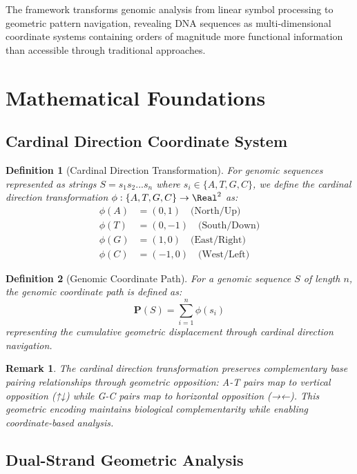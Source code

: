\documentclass[12pt,a4paper]{article}
\newtheorem{definition}{Definition}
\newtheorem{remark}{Remark}
\begin{document}
The framework transforms genomic analysis from linear symbol processing to geometric pattern navigation, revealing DNA sequences as multi-dimensional coordinate systems containing orders of magnitude more functional information than accessible through traditional approaches.

\section{Mathematical Foundations}

\subsection{Cardinal Direction Coordinate System}

\begin{definition}[Cardinal Direction Transformation]
For genomic sequences represented as strings $S = s_1s_2...s_n$ where $s_i \in \{A, T, G, C\}$, we define the cardinal direction transformation $\phi: \{A, T, G, C\} \to \Real^2$ as:
\begin{align}
\phi(A) &= (0, 1) \quad \text{(North/Up)} \\
\phi(T) &= (0, -1) \quad \text{(South/Down)} \\
\phi(G) &= (1, 0) \quad \text{(East/Right)} \\
\phi(C) &= (-1, 0) \quad \text{(West/Left)}
\end{align}
\end{definition}

\begin{definition}[Genomic Coordinate Path]
For a genomic sequence $S$ of length $n$, the genomic coordinate path is defined as:
\begin{equation}
\mathbf{P}(S) = \sum_{i=1}^n \phi(s_i)
\end{equation}
representing the cumulative geometric displacement through cardinal direction navigation.
\end{definition}

\begin{remark}
The cardinal direction transformation preserves complementary base pairing relationships through geometric opposition: A-T pairs map to vertical opposition (↑↓) while G-C pairs map to horizontal opposition (→←). This geometric encoding maintains biological complementarity while enabling coordinate-based analysis.
\end{remark}

\subsection{Dual-Strand Geometric Analysis}
\end{document}
